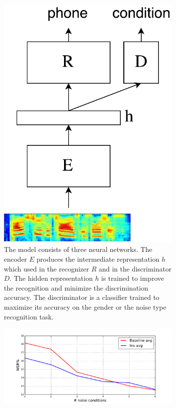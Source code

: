 \documentclass{article}
\begin{document}
\begin{figure}
    \centering
    \begin{subfigure}[b]{0.3\linewidth}
        \centering
        \includegraphics[width=0.9\linewidth]{model.pdf}
        \caption{The model consists of three neural networks. The encoder $E$ produces
        the intermediate representation $h$ which used in the recognizer $R$ and 
        in the discriminator $D$. The hidden representation $h$ is trained to improve
        the recognition and minimize the discrimination accuracy. The discriminator
        is a classifier trained to maximize its accuracy on the gender or the noise type
        recognition task.}
        \label{fig:model}
    \end{subfigure}%
    \begin{subfigure}[b]{0.7\linewidth}
        \centering
        \includegraphics[width=\linewidth]{wer_avg.pdf}

\end{subfigure}
\end{figure}
\end{document}
